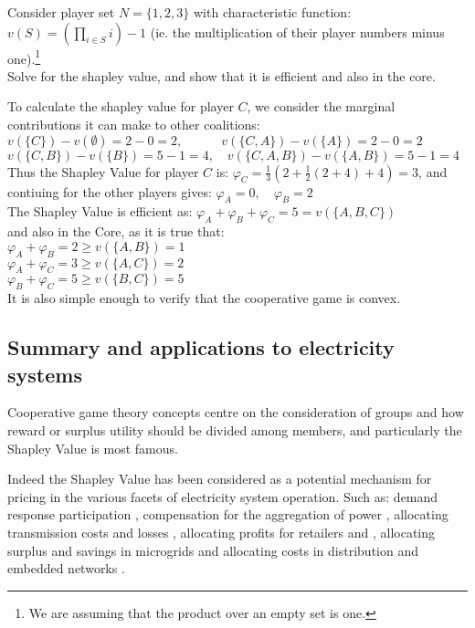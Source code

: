 \begin{example}
Consider player set $N=\{1,2,3\}$ with characteristic function:\\
$v(S)=\left(\prod_{i\in S}i\right)-1$ (ie. the multiplication of their player numbers minus one).\footnote{We are assuming that the product over an empty set is one.}\\
Solve for the shapley value, and show that it is efficient and also in the core.
\end{example}

\begin{solution}
To calculate the shapley value for player $C$, we consider the marginal contributions it can make to other coalitions:\\
$ v(\{C\})-v(\emptyset) = 2-0 = 2, \quad\quad\quad v(\{C,A\})-v(\{A\}) = 2-0 = 2$\\
$ v(\{C,B\})-v(\{B\}) = 5-1 = 4, \quad v(\{C,A,B\})-v(\{A,B\}) = 5-1 = 4  $\\
Thus the Shapley Value for player $C$ is:
$\varphi_C = \frac{1}{3}\left(2 + \frac{1}{2}(2+4) + 4\right) = 3$, and contiuing for the other players gives:
$\varphi_A = 0,\quad\varphi_B = 2$\\
The Shapley Value is efficient as: $\varphi_A+\varphi_B+\varphi_C = 5 = v(\{A,B,C\})$\\
and also in the Core, as it is true that:\\
$\varphi_A+\varphi_B=2\ge v(\{A,B\})=1$\\
$\varphi_A+\varphi_C=3\ge v(\{A,C\})=2$\\
$\varphi_B+\varphi_C=5\ge v(\{B,C\})=5$\\
It is also simple enough to verify that the cooperative game is convex.

\end{solution}

\subsection{Summary and applications to electricity systems}

Cooperative game theory concepts centre on the consideration of groups and how reward or surplus utility should be divided among members, and particularly the Shapley Value is most famous.

Indeed the Shapley Value has been considered as a potential mechanism for pricing in the various facets of electricity system operation.
Such as: demand response participation \citep{DBLP:journals/tsg/OBrienGR15,electronics8010048,WANG201972}, compensation for the aggregation of power \citep{Perez-Diaz:2018:CEV:3237383.3237484,6520960}, allocating transmission costs and losses \citep{ip-gtd_20020005,SHARMA201733}, allocating profits for retailers and \citep{ACUNA2018161,WANG201972}, allocating surplus and savings in microgrids \citep{WU2017384} and allocating costs in distribution and embedded networks \citep{archie_paper1,8226810,10.1007/978-3-642-40776-5_19,6840296,DBLP:journals/corr/abs-1903-10965,AzuatalamCV_PowerTech2019}.

